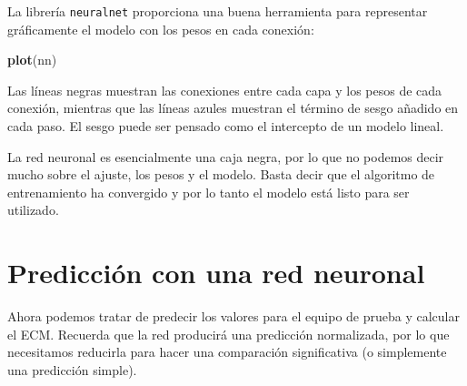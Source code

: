 \documentclass[]{book}
\newenvironment{Shaded}{\begin{snugshade}}{\end{snugshade}}
\newcommand{\KeywordTok}[1]{\textcolor[rgb]{0.13,0.29,0.53}{\textbf{#1}}}
\newcommand{\DecValTok}[1]{\textcolor[rgb]{0.00,0.00,0.81}{#1}}
\newcommand{\StringTok}[1]{\textcolor[rgb]{0.31,0.60,0.02}{#1}}
\newcommand{\OperatorTok}[1]{\textcolor[rgb]{0.81,0.36,0.00}{\textbf{#1}}}
\newcommand{\NormalTok}[1]{#1}
\begin{document}
La librería \texttt{neuralnet} proporciona una buena herramienta para
representar gráficamente el modelo con los pesos en cada conexión:

\begin{Shaded}
\begin{Highlighting}[]
\KeywordTok{plot}\NormalTok{(nn)}
\end{Highlighting}
\end{Shaded}

Las líneas negras muestran las conexiones entre cada capa y los pesos de
cada conexión, mientras que las líneas azules muestran el término de
sesgo añadido en cada paso. El sesgo puede ser pensado como el
intercepto de un modelo lineal.

La red neuronal es esencialmente una caja negra, por lo que no podemos
decir mucho sobre el ajuste, los pesos y el modelo. Basta decir que el
algoritmo de entrenamiento ha convergido y por lo tanto el modelo está
listo para ser utilizado.

\section{Predicción con una red
neuronal}\label{prediccion-con-una-red-neuronal}

Ahora podemos tratar de predecir los valores para el equipo de prueba y
calcular el ECM. Recuerda que la red producirá una predicción
normalizada, por lo que necesitamos reducirla para hacer una comparación
significativa (o simplemente una predicción simple).

\begin{Shaded}
\end{Shaded}
\end{document}

